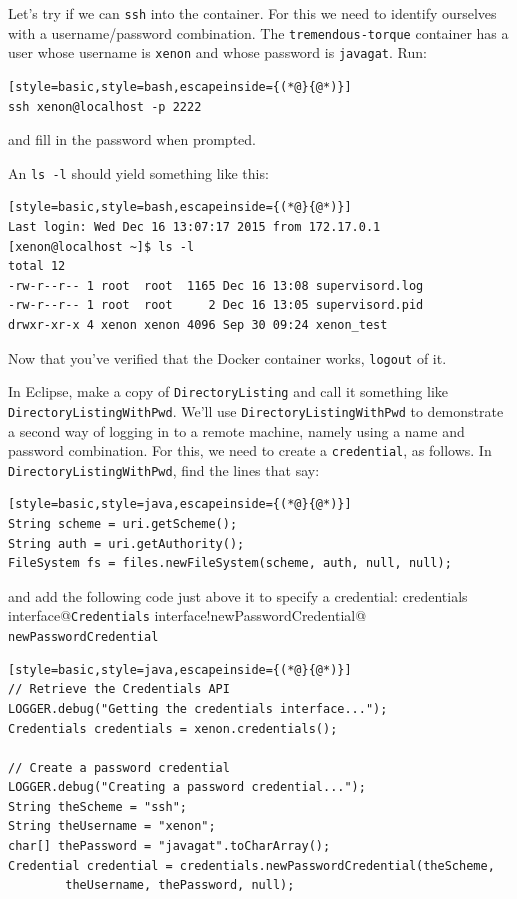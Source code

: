 \documentclass[12pt, a4paper, twoside, openany, titlepage]{book}
\begin{document}
Let's try if we can \texttt{ssh} into the container. For this we need to
identify ourselves with a username/password combination. The \texttt
{tremendous-torque} container has a user whose username is \texttt{xenon}
and whose password is \texttt{javagat}. Run:
\begin{lstlisting}[style=basic,style=bash,escapeinside={(*@}{@*)}]
ssh xenon@localhost -p 2222
\end{lstlisting}
and fill in the password when prompted.

An \texttt{ls -l} should yield something like this:
\begin{lstlisting}[style=basic,style=bash,escapeinside={(*@}{@*)}]
Last login: Wed Dec 16 13:07:17 2015 from 172.17.0.1
[xenon@localhost ~]$ ls -l
total 12
-rw-r--r-- 1 root  root  1165 Dec 16 13:08 supervisord.log
-rw-r--r-- 1 root  root     2 Dec 16 13:05 supervisord.pid
drwxr-xr-x 4 xenon xenon 4096 Sep 30 09:24 xenon_test
\end{lstlisting} %

Now that you've verified that the Docker container works, \texttt{logout} of it.

In Eclipse, make a copy of \texttt{DirectoryListing} and call it something
like \texttt{DirectoryListingWithPwd}. We'll use \texttt
{DirectoryListingWithPwd} to demonstrate a second way of logging in to a
remote machine, namely using a name and password combination. For this, we
need to create a \texttt{credential}, as follows. In \texttt
{DirectoryListingWithPwd}, find the lines that say:
\begin{lstlisting}[style=basic,style=java,escapeinside={(*@}{@*)}]
String scheme = uri.getScheme();
String auth = uri.getAuthority();
FileSystem fs = files.newFileSystem(scheme, auth, null, null);
\end{lstlisting}

and add the following code just above it to specify a credential:\index
{credentials interface@\texttt{Credentials} interface!newPasswordCredential@
\texttt{newPasswordCredential}}
\begin{lstlisting}[style=basic,style=java,escapeinside={(*@}{@*)}]
// Retrieve the Credentials API
LOGGER.debug("Getting the credentials interface...");
Credentials credentials = xenon.credentials();

// Create a password credential
LOGGER.debug("Creating a password credential...");
String theScheme = "ssh";
String theUsername = "xenon";
char[] thePassword = "javagat".toCharArray();
Credential credential = credentials.newPasswordCredential(theScheme,
        theUsername, thePassword, null);
\end{lstlisting}
\label{credentials-snippet}
\end{document}

